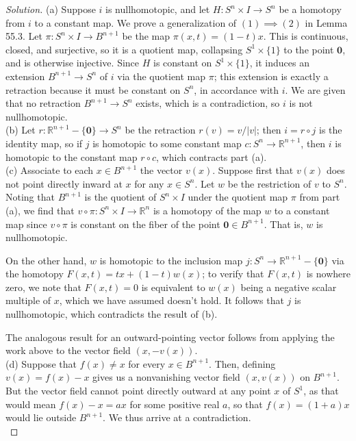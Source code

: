 \documentclass[10pt]{article}
\providecommand{\RR}{\mathbb R}
\providecommand{\mb}[1]{\mathbf{#1}}
\newenvironment{soln}{\begin{proof}[Solution]}{\end{proof}}
\providecommand{\abs}[1]{\left\lvert #1\right\rvert}
\begin{document}
\begin{soln}
    (a) Suppose $i$ is nullhomotopic, and let $H\colon S^n\times I\to S^n$
    be a homotopy from $i$ to a constant map.
    We prove a generalization of $(1)\implies(2)$ in Lemma 55.3.
    Let $\pi\colon S^n\times I\to B^{n+1}$ be the map $\pi(x,t) = (1-t)x$.
    This is continuous, closed, and surjective, so it is a quotient map,
    collapsing $S^1\times\{1\}$ to the point $\mb 0$,
    and is otherwise injective.
    Since $H$ is constant on $S^1\times\{1\}$,
    it induces an extension $B^{n+1}\to S^n$ of $i$ via the quotient map $\pi$;
    this extension is exactly a retraction because
    it must be constant on $S^n$, in accordance with $i$.
    We are given that no retraction $B^{n+1}\to S^n$ exists,
    which is a contradiction, so $i$ is not nullhomotopic.
    \\

    (b) Let $r\colon\RR^{n+1}-\{\mb0\}\to S^n$ be the retraction
    $r(v) = v/\abs v$; then $i = r\circ j$ is the identity map,
    so if $j$ is homotopic to some constant map $c\colon S^n\to\RR^{n+1}$,
    then $i$ is homotopic to the constant map $r\circ c$,
    which contracts part (a).
    \\

    (c) Associate to each $x\in B^{n+1}$ the vector $v(x)$.
    Suppose first that $v(x)$ does not point directly inward at $x$
    for any $x\in S^n$. Let $w$ be the restriction of $v$ to $S^n$.
    Noting that $B^{n+1}$ is the quotient of $S^n\times I$
    under the quotient map $\pi$ from part (a), we find that
    $v\circ\pi\colon S^n\times I\to\RR^n$ is
    a homotopy of the map $w$ to a constant map
    since $v\circ\pi$ is constant on the fiber of the point $\mb 0\in B^{n+1}$.
    That is, $w$ is nullhomotopic.

    On the other hand, $w$ is homotopic to the inclusion map
    $j\colon S^n\to\RR^{n+1}-\{\mb0\}$ via the homotopy
    $F(x,t) = tx + (1-t)w(x)$; to verify that $F(x,t)$ is nowhere zero,
    we note that $F(x,t) = 0$ is equivalent to $w(x)$ being
    a negative scalar multiple of $x$, which we have assumed doesn't hold.
    It follows that $j$ is nullhomotopic, which contradicts the result of (b).

    The analogous result for an outward-pointing vector
    follows from applying the work above to the vector field $(x,-v(x))$.
    \\

    (d) Suppose that $f(x)\ne x$ for every $x\in B^{n+1}$.
    Then, defining $v(x) = f(x) - x$ gives us a nonvanishing vector field
    $(x,v(x))$ on $B^{n+1}$. But the vector field
    cannot point directly outward at any point $x$ of $S^1$,
    as that would mean $f(x) - x = ax$ for some positive real $a$,
    so that $f(x) = (1 + a)x$ would lie outside $B^{n+1}$.
    We thus arrive at a contradiction.
    \\


\end{soln}
\end{document}
